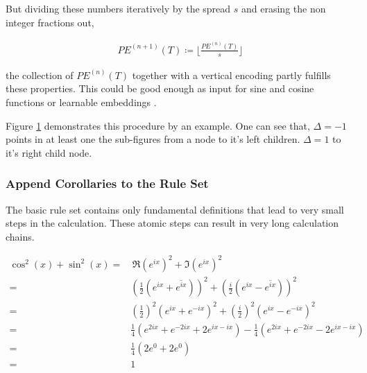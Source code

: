 \documentclass{scrartcl}
\theoremstyle{definition}
\begin{document}
But dividing these numbers iteratively by the spread $s$ and erasing the non integer fractions out,

\begin{align}
	PE^{(n+1)}\left( T \right) \coloneqq \lfloor \frac{PE^{(n)} \left( T \right)}{s} \rfloor
	\label{eq:positional_encoding}
\end{align}

the collection of $PE^{(n)}\left( T \right)$ together with a vertical encoding partly fulfills these properties.
This could be good enough as input for sine and cosine functions or learnable embeddings \cite{gehring2017convolutional}.

\begin{figure}[!htbp]
	\centering
	
	\label{fig:positional_encoding}
\end{figure}

Figure \ref{fig:positional_encoding} demonstrates this procedure by an example.
One can see that, $\Delta=-1$ points in at least one the sub-figures from a node to it's left children. $\Delta=1$ to it's right child node. 


\subsubsection{Append Corollaries to the Rule Set}

The basic rule set contains only fundamental definitions that lead to very small steps in the calculation.
These atomic steps can result in very long calculation chains.%

\begin{equation}
	\label{eq:tedios_calculation}
	\begin{aligned}
		\cos^2(x)+\sin^2(x) = &\, \Re\left(e^{ix}\right)^2+\Im\left(e^{ix}\right)^2 \\
		= & \left(\frac{1}{2} \left(e^{ix}+\overline{e^{ix}}\right)\right)^2 + \left(\frac{i}{2} \left(e^{ix}-\overline{e^{ix}}\right)\right)^2 \\
		= & \left(\frac{1}{2}\right)^2 \left(e^{ix}+e^{-ix}\right)^2 + \left(\frac{i}{2}\right)^2 \left(e^{ix}-e^{-ix}\right)^2 \\
		= & \frac{1}{4} \left(e^{2ix}+e^{-2ix}+2e^{ix-ix}\right) - \frac{1}{4} \left(e^{2ix}+e^{-2ix}-2e^{ix-ix}\right) \\
		= & \frac{1}{4} \left( 2e^0+2e^0 \right) \\
		= & 1
	\end{aligned}
\end{equation}
\end{document}
